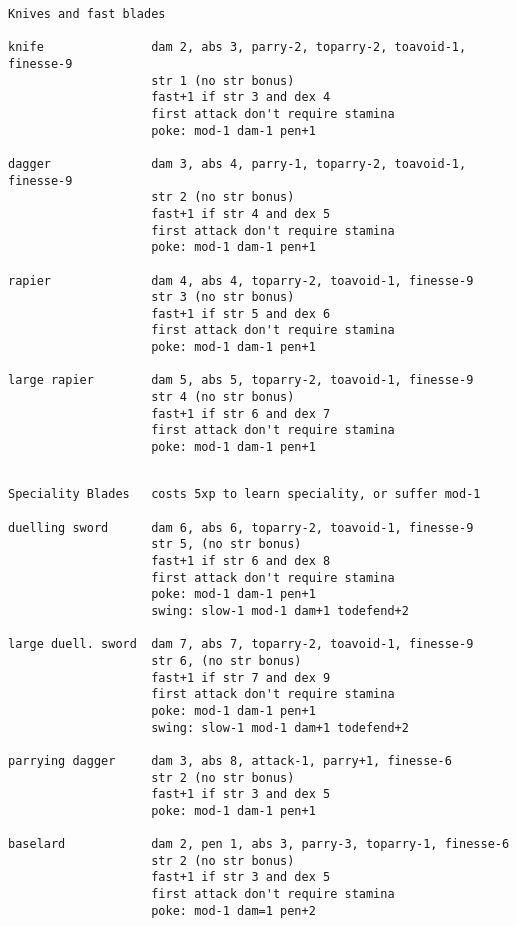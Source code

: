 \begin{verbatim}
\end{verbatim} \pagebreak[1] \begin{verbatim}
Knives and fast blades

knife               dam 2, abs 3, parry-2, toparry-2, toavoid-1, finesse-9
                    str 1 (no str bonus)
                    fast+1 if str 3 and dex 4
                    first attack don't require stamina
                    poke: mod-1 dam-1 pen+1

dagger              dam 3, abs 4, parry-1, toparry-2, toavoid-1, finesse-9
                    str 2 (no str bonus)
                    fast+1 if str 4 and dex 5
                    first attack don't require stamina
                    poke: mod-1 dam-1 pen+1

rapier              dam 4, abs 4, toparry-2, toavoid-1, finesse-9
                    str 3 (no str bonus)
                    fast+1 if str 5 and dex 6
                    first attack don't require stamina
                    poke: mod-1 dam-1 pen+1

large rapier        dam 5, abs 5, toparry-2, toavoid-1, finesse-9
                    str 4 (no str bonus)
                    fast+1 if str 6 and dex 7
                    first attack don't require stamina
                    poke: mod-1 dam-1 pen+1


\end{verbatim} \pagebreak[1] \begin{verbatim}
Speciality Blades   costs 5xp to learn speciality, or suffer mod-1

duelling sword      dam 6, abs 6, toparry-2, toavoid-1, finesse-9
                    str 5, (no str bonus)
                    fast+1 if str 6 and dex 8
                    first attack don't require stamina
                    poke: mod-1 dam-1 pen+1
                    swing: slow-1 mod-1 dam+1 todefend+2

large duell. sword  dam 7, abs 7, toparry-2, toavoid-1, finesse-9
                    str 6, (no str bonus)
                    fast+1 if str 7 and dex 9
                    first attack don't require stamina
                    poke: mod-1 dam-1 pen+1
                    swing: slow-1 mod-1 dam+1 todefend+2

parrying dagger     dam 3, abs 8, attack-1, parry+1, finesse-6
                    str 2 (no str bonus)
                    fast+1 if str 3 and dex 5
                    poke: mod-1 dam-1 pen+1

baselard            dam 2, pen 1, abs 3, parry-3, toparry-1, finesse-6
                    str 2 (no str bonus)
                    fast+1 if str 3 and dex 5
                    first attack don't require stamina
                    poke: mod-1 dam=1 pen+2


\end{verbatim}
